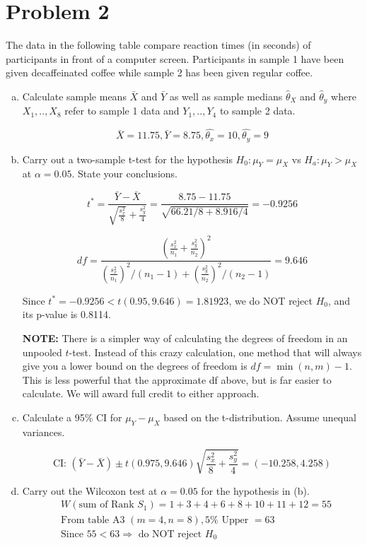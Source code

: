 \documentclass[12pt]{article}
\begin{document}
\section*{Problem 2}
The data in the following table compare reaction times (in seconds) of participants in front
of a computer screen. Participants in sample 1 have been given decaffeinated coffee while sample
2 has been given regular coffee.

\begin{enumerate}[(a)]
\item Calculate sample means $\bar X$ and $\bar Y$ as well as sample medians $\hat\theta_X$ and $\hat\theta_y$ where $X_1,..,X_8$ refer to sample 1 data and $Y_1,..,Y_4$ to sample 2 data.

\[ \bar{X}=11.75, \bar{Y}=8.75, \hat{\theta_x}=10, \hat{\theta_y}=9 \]

\item Carry out a two-sample t-test for the hypothesis $H_0:\mu_Y=\mu_X$ vs $H_a:\mu_Y>\mu_X$ at $\alpha=0.05$. State your conclusions.

\[t^*=\frac{\bar{Y}-\bar{X}}{\sqrt{\frac{s_x^2}{8}}+\frac{s_y^2}{4}}=\frac{8.75-11.75}{\sqrt{66.21/8+8.916/4}}=-0.9256 \]

\[ df= \frac{(\frac{s_x^2}{n_1}+\frac{s_y^2}{n_2})^2}{(\frac{s_x^2}{n_1})^2/(n_1-1)+(\frac{s_y^2}{n_2})^2/(n_2-1)}=9.646 \]

Since $t^* = -0.9256 < t(0.95,9.646) = 1.81923$, we do NOT reject $H_0$, and its p-value  is 0.8114.

\textbf{NOTE: } There is a simpler way of calculating the degrees of freedom in an unpooled $t$-test. Instead of this crazy calculation, one method that will always give you a lower bound on the degrees of freedom is $df = \min(n, m) - 1$. This is less powerful that the approximate df above, but is far easier to calculate. We will award full credit to either approach.

\item Calculate a 95\% CI for $\mu_Y-\mu_X$ based on the t-distribution. Assume unequal variances.

\[ \text{CI: } (\bar{Y}-\bar{X}) \pm t(0.975,9.646) \sqrt{ \frac{s_x^2}{8} + \frac{s_y^2}{4} } = (-10.258, 4.258) \]

\item Carry out the Wilcoxon test at $\alpha=0.05$ for the hypothesis in (b).
\begin{align*}
& W(\text{sum of Rank } S_1)=1+3+4+6+8+10+11+12=55 \\
& \text{From table A3 } (m=4, n=8), 5\% \text{ Upper } = 63\\
& \text{Since } 55<63 \Rightarrow \text{ do NOT reject } H_0\\
\end{align*}
\vspace{-3em}


\end{enumerate}
\end{document}
